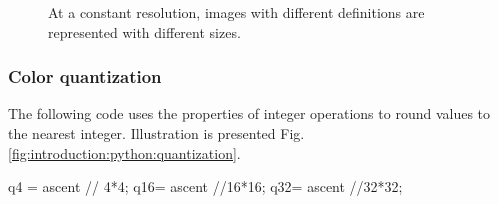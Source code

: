 \begin{figure}[H]
 \centering\caption{At a constant resolution, images with different definitions are represented with different sizes.}%
 \hspace{1cm}
 \hspace{1cm}
 \label{fig:introduction:python:resolution}%
\end{figure}


\subsubsection{Color quantization}
The following code uses the properties of integer operations to round values to the nearest integer. Illustration is presented Fig. \ref{fig:introduction:python:quantization}.

\begin{python}
q4 = ascent // 4*4;
q16= ascent //16*16;
q32= ascent //32*32;
\end{python}

\vspace*{-3mm}

